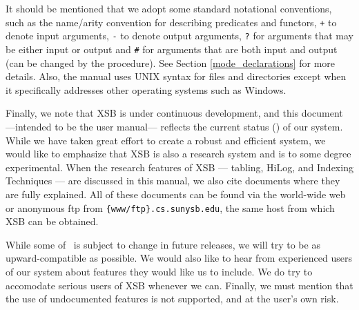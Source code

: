 It should be mentioned that we adopt some standard notational
conventions, such as the name/arity convention for describing
predicates and functors, {\tt +} to denote input arguments, {\tt -} to
denote output arguments, {\tt ?} for arguments that may be either
input or output and {\tt \#} for arguments that are both input and
output (can be changed by the procedure).  See Section
\ref{mode_declarations} for more details.
  Also, the manual uses UNIX syntax for
files and directories except when it specifically addresses other
operating systems such as Windows.  

Finally, we note that XSB is under continuous development, and
this document ---intended to be the user manual--- reflects the
current status (\version) of our system.  While we have taken great
effort to create a robust and efficient system, we would like to
emphasize that XSB is also a research system and is to some
degree experimental.  When the research features of XSB ---
tabling, HiLog, and Indexing Techniques --- are discussed in this
manual, we also cite documents where they are fully explained.  All of
these documents can be found via the world-wide web or anonymous ftp
from {\tt \{www/ftp\}.cs.sunysb.edu}, the same host from which XSB can
be obtained.

While some of \version\ is subject to change in future releases, we
will try to be as upward-compatible as possible. We would also like to
hear from experienced users of our system about features they would
like us to include.  We do try to accomodate serious users of XSB
whenever we can.  Finally, we must mention that the use of
undocumented features is not supported, and at the user's own risk.



